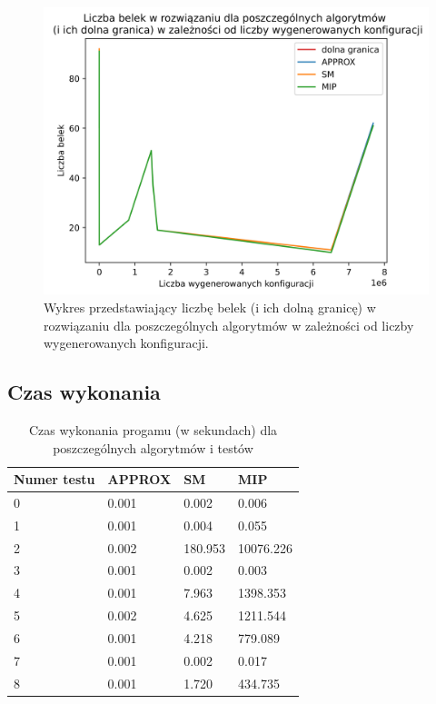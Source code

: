 \begin{figure}[H]
	\begin{center}
		\includegraphics[width=12cm]{plots/res_configs}
		\caption{Wykres przedstawiający liczbę belek (i ich dolną granicę) w rozwiązaniu dla poszczególnych algorytmów w zależności od liczby wygenerowanych konfiguracji.}
	\end{center}
\end{figure}

\subsection{Czas wykonania}

\begin{table}[H] 
	\begin{center}
		\begin{tabular}{|p{3cm}|p{3cm}|p{3cm}|p{3cm}| } \hline
			Numer testu & APPROX & SM & MIP\\ \hline
			0 & 0.001 & 0.002 & 0.006\\ 
			1 & 0.001 & 0.004 & 0.055\\ 
			2 & 0.002 & 180.953 & 10076.226\\ 
			3 & 0.001 & 0.002 & 0.003\\ 
			4 & 0.001 & 7.963 & 1398.353\\ 
			5 & 0.002 & 4.625 & 1211.544\\ 
			6 & 0.001 & 4.218 & 779.089\\ 
			7 & 0.001 & 0.002 & 0.017\\ 
			8 & 0.001 & 1.720 & 434.735\\ 
			
			\hline
		\end{tabular}
		\caption{Czas wykonania progamu (w sekundach) dla poszczególnych algorytmów i testów}
	\end{center}
\end{table}

